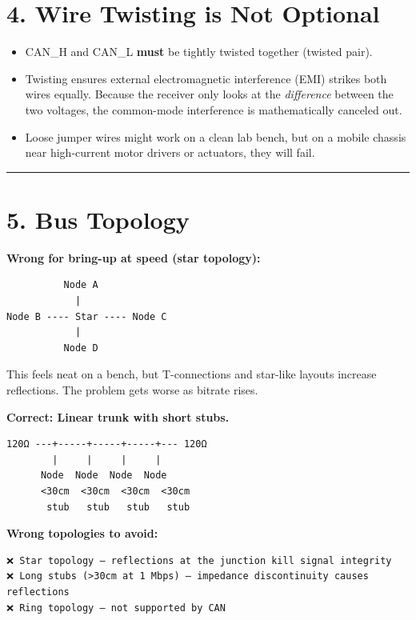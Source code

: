\documentclass[12pt,a4paper,oneside]{report}
\providecommand{\tightlist}{\setlength{\itemsep}{0pt}\setlength{\parskip}{0pt}}
\begin{document}
\section{4. Wire Twisting is Not Optional}\label{wire-twisting-is-not-optional}

\begin{itemize}
\tightlist
\item
  CAN\_H and CAN\_L \textbf{must} be tightly twisted together (twisted pair).
\item
  Twisting ensures external electromagnetic interference (EMI) strikes both
  wires equally. Because the receiver only looks at the \emph{difference}
  between the two voltages, the common-mode interference is mathematically
  canceled out.
\item
  Loose jumper wires might work on a clean lab bench, but on a mobile chassis
  near high-current motor drivers or actuators, they will fail.
\end{itemize}

\begin{center}\rule{0.5\linewidth}{0.5pt}\end{center}

\section{5. Bus Topology}\label{bus-topology}

\textbf{Wrong for bring-up at speed (star topology):}

\begin{verbatim}
          Node A
            |
Node B ---- Star ---- Node C
            |
          Node D
\end{verbatim}

This feels neat on a bench, but T-connections and star-like layouts increase
reflections. The problem gets worse as bitrate rises.

\textbf{Correct: Linear trunk with short stubs.}

\begin{verbatim}
120Ω ---+-----+-----+-----+--- 120Ω
        |     |     |     |
      Node  Node  Node  Node
      <30cm  <30cm  <30cm  <30cm
       stub   stub   stub   stub
\end{verbatim}

\textbf{Wrong topologies to avoid:}

\begin{verbatim}
❌ Star topology — reflections at the junction kill signal integrity
❌ Long stubs (>30cm at 1 Mbps) — impedance discontinuity causes reflections
❌ Ring topology — not supported by CAN
\end{verbatim}
\end{document}
